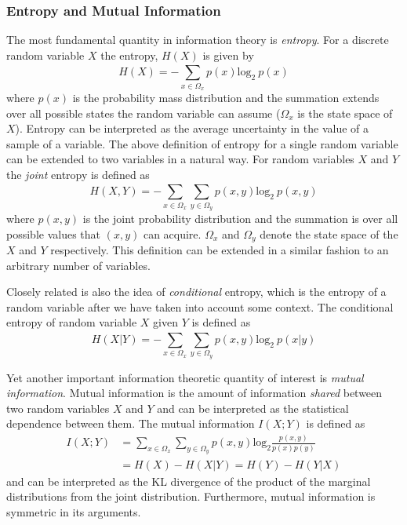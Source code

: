 \documentclass[12pt]{article}
\begin{document}
\subsubsection{Entropy and Mutual Information}
The most fundamental quantity in information theory is \textit{entropy}. For a discrete random variable $X$ the entropy, $H(X)$ is given by
\begin{equation*}
H(X) = -\sum_{x \in \Omega_x}^{} p(x)\text{log}_{2}~p(x)
\end{equation*}
where $p(x)$ is the probability mass distribution and the summation extends over all possible states the random variable can assume ($\Omega_x$ is the state space of $X$). Entropy can be interpreted as the average uncertainty in the value of a sample of a variable. 
The above definition of entropy for a single random variable can be extended to two variables in a natural way. For random variables $X$ and $Y$ the \textit{joint} entropy is defined as 
\begin{equation*}
H(X, Y) = -\sum_{x \in \Omega_x}^{}\sum_{y \in \Omega_y}^{}p(x,y)\text{log}_2~p(x,y)
\end{equation*}
where $p(x,y)$ is the joint probability distribution and the summation is over all possible values that $(x,y)$ can acquire. $\Omega_x$ and $\Omega_y$ denote the state space of the $X$ and $Y$ respectively. This definition can be extended in a similar fashion to an arbitrary number of variables. 

Closely related is also the idea of \textit{conditional} entropy, which is the entropy of a random variable after we have taken into account some context. The conditional entropy of random variable $X$ given $Y$ is defined as 
\begin{equation*}
H(X|Y) = -\sum_{x \in \Omega_x}^{}\sum_{y \in \Omega_y}^{}p(x, y)\text{log}_2~p(x|y)
\end{equation*}

Yet another important information theoretic quantity of interest is \textit{mutual information}. Mutual information is the amount of information \textit{shared} between two random variables $X$ and $Y$ and can be interpreted as the statistical dependence between them. The mutual information $I(X;Y)$ is defined as 
\begin{align*}
I(X;Y) &= \sum_{x \in \Omega_x}^{}\sum_{y \in \Omega_y}^{}p(x,y)\text{log}_2\frac{p(x,y)}{p(x)p(y)} \\
&=  H(X) - H(X|Y) = H(Y) - H(Y|X)
\end{align*}
and can be interpreted as the KL divergence of the product of the marginal distributions from the joint distribution. Furthermore, mutual information is symmetric in its arguments. 
\end{document}
